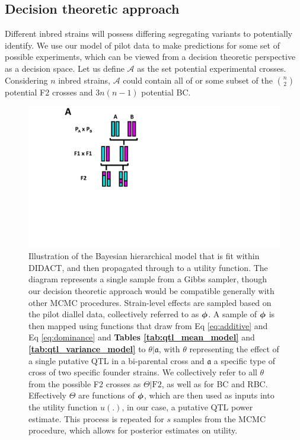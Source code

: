 
\subsection{Decision theoretic approach} 

Different inbred strains will possess differing segregating variants to potentially identify. We use our model of pilot data to make predictions for some set of possible experiments, which can be viewed from a decision theoretic \citep{Raiffa2000} perspective as a decision space. Let us define $\mathcal{A}$ as the set potential experimental crosses. Considering $n$ inbred strains, $\mathcal{A}$ could contain all of or some subset of the ${n \choose 2}$ potential F2 crosses and $3n(n - 1)$ potential BC. 

\begin{figure}
\renewcommand{\familydefault}{\sfdefault}\normalfont
\centering
\includegraphics[width=\linewidth, page=8, trim={0in 0in 0in 0in}, clip]{figures/2-didact/mapping_crosses.pdf}
\caption[Illustration of DIDACT]{Illustration of the Bayesian hierarchical model that is fit within DIDACT, and then propagated through to a utility function. The diagram represents a single sample from a Gibbs sampler, though our decision theoretic approach would be compatible generally with other MCMC procedures. Strain-level effects are sampled based on the pilot diallel data, collectively referred to as $\boldsymbol{\phi}$. A sample of $\boldsymbol{\phi}$ is then mapped using functions that draw from Eq \ref{eq:additive} and Eq \ref{eq:dominance} and \textbf{Tables \ref{tab:qtl_mean_model}} and \textbf{\ref{tab:qtl_variance_model}} to $\theta|\mathfrak{a}$, with $\theta$ representing the effect of a single putative QTL in a bi-parental cross and $\mathfrak{a}$ a specific type of cross of two specific founder strains. We collectively refer to all $\theta$ from the possible F2 crosses as $\Theta|\text{F2}$, as well as for BC and RBC. Effectively $\Theta$ are functions of $\boldsymbol{\phi}$, which are then used as inputs into the utility function $u(.)$, in our case, a putative QTL power estimate. This process is repeated for $s$ samples from the MCMC procedure, which allows for posterior estimates on utility.\label{fig:didact_process}}
\end{figure}

